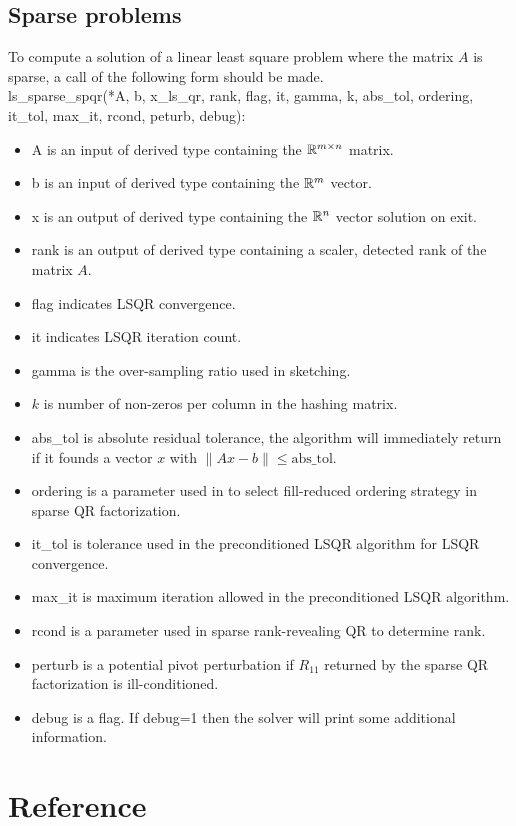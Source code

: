\documentclass[english,11pt]{article}
\begin{document}
\subsection{Sparse problems}

To compute a solution of a linear least square problem where the matrix $A$ is sparse, a call of the following form should be made. \\

ls_sparse_spqr(*A, b, x_ls_qr, 
    rank, flag, it, gamma, k, abs_tol, ordering, it_tol, max_it, rcond, peturb, debug):

\begin{itemize}
	\setlength\itemsep{-0.5em}
	\item A is an input of derived type containing the $\mathbb{R}^{m\times n}$ matrix.

	\item b is an input of derived type containing the $\mathbb{R}^m$ vector.

	\item x is an output of derived type containing the $\mathbb{R}^n$ vector solution on exit. 

	\item rank is an output of derived type containing a scaler, detected rank of the matrix $A$. 

	\item flag indicates LSQR convergence. 

	\item it indicates LSQR iteration count. 

	\item gamma is the over-sampling ratio used in sketching. 

	\item $k$ is number of non-zeros per column in the hashing matrix.

	\item abs_tol is absolute residual tolerance, the algorithm will immediately return if it founds a vector $x$ with $\|Ax-b\| \leq \text{abs_tol}$.

	\item ordering is a parameter used in to select fill-reduced ordering strategy in sparse QR factorization.

	\item it_tol is tolerance used in the preconditioned LSQR algorithm for LSQR convergence.

	\item max_it is maximum iteration allowed in the preconditioned LSQR algorithm. 

	\item rcond is a parameter used in sparse rank-revealing QR to determine rank. 

	\item perturb is a potential pivot perturbation if $R_{11}$ returned by the sparse QR factorization is ill-conditioned. 

	\item debug is a flag. If debug=1 then the solver will print some additional information. 

\end{itemize}


\section{Reference}


\clearpage
 

\end{document}
